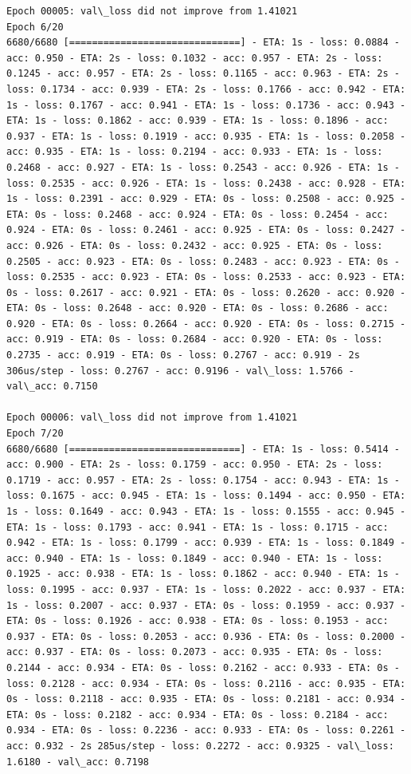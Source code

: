 \documentclass[11pt]{article}
\begin{document}
\begin{Verbatim}[commandchars=\\\{\}]
Epoch 00005: val\_loss did not improve from 1.41021
Epoch 6/20
6680/6680 [==============================] - ETA: 1s - loss: 0.0884 - acc: 0.950 - ETA: 2s - loss: 0.1032 - acc: 0.957 - ETA: 2s - loss: 0.1245 - acc: 0.957 - ETA: 2s - loss: 0.1165 - acc: 0.963 - ETA: 2s - loss: 0.1734 - acc: 0.939 - ETA: 2s - loss: 0.1766 - acc: 0.942 - ETA: 1s - loss: 0.1767 - acc: 0.941 - ETA: 1s - loss: 0.1736 - acc: 0.943 - ETA: 1s - loss: 0.1862 - acc: 0.939 - ETA: 1s - loss: 0.1896 - acc: 0.937 - ETA: 1s - loss: 0.1919 - acc: 0.935 - ETA: 1s - loss: 0.2058 - acc: 0.935 - ETA: 1s - loss: 0.2194 - acc: 0.933 - ETA: 1s - loss: 0.2468 - acc: 0.927 - ETA: 1s - loss: 0.2543 - acc: 0.926 - ETA: 1s - loss: 0.2535 - acc: 0.926 - ETA: 1s - loss: 0.2438 - acc: 0.928 - ETA: 1s - loss: 0.2391 - acc: 0.929 - ETA: 0s - loss: 0.2508 - acc: 0.925 - ETA: 0s - loss: 0.2468 - acc: 0.924 - ETA: 0s - loss: 0.2454 - acc: 0.924 - ETA: 0s - loss: 0.2461 - acc: 0.925 - ETA: 0s - loss: 0.2427 - acc: 0.926 - ETA: 0s - loss: 0.2432 - acc: 0.925 - ETA: 0s - loss: 0.2505 - acc: 0.923 - ETA: 0s - loss: 0.2483 - acc: 0.923 - ETA: 0s - loss: 0.2535 - acc: 0.923 - ETA: 0s - loss: 0.2533 - acc: 0.923 - ETA: 0s - loss: 0.2617 - acc: 0.921 - ETA: 0s - loss: 0.2620 - acc: 0.920 - ETA: 0s - loss: 0.2648 - acc: 0.920 - ETA: 0s - loss: 0.2686 - acc: 0.920 - ETA: 0s - loss: 0.2664 - acc: 0.920 - ETA: 0s - loss: 0.2715 - acc: 0.919 - ETA: 0s - loss: 0.2684 - acc: 0.920 - ETA: 0s - loss: 0.2735 - acc: 0.919 - ETA: 0s - loss: 0.2767 - acc: 0.919 - 2s 306us/step - loss: 0.2767 - acc: 0.9196 - val\_loss: 1.5766 - val\_acc: 0.7150

Epoch 00006: val\_loss did not improve from 1.41021
Epoch 7/20
6680/6680 [==============================] - ETA: 1s - loss: 0.5414 - acc: 0.900 - ETA: 2s - loss: 0.1759 - acc: 0.950 - ETA: 2s - loss: 0.1719 - acc: 0.957 - ETA: 2s - loss: 0.1754 - acc: 0.943 - ETA: 1s - loss: 0.1675 - acc: 0.945 - ETA: 1s - loss: 0.1494 - acc: 0.950 - ETA: 1s - loss: 0.1649 - acc: 0.943 - ETA: 1s - loss: 0.1555 - acc: 0.945 - ETA: 1s - loss: 0.1793 - acc: 0.941 - ETA: 1s - loss: 0.1715 - acc: 0.942 - ETA: 1s - loss: 0.1799 - acc: 0.939 - ETA: 1s - loss: 0.1849 - acc: 0.940 - ETA: 1s - loss: 0.1849 - acc: 0.940 - ETA: 1s - loss: 0.1925 - acc: 0.938 - ETA: 1s - loss: 0.1862 - acc: 0.940 - ETA: 1s - loss: 0.1995 - acc: 0.937 - ETA: 1s - loss: 0.2022 - acc: 0.937 - ETA: 1s - loss: 0.2007 - acc: 0.937 - ETA: 0s - loss: 0.1959 - acc: 0.937 - ETA: 0s - loss: 0.1926 - acc: 0.938 - ETA: 0s - loss: 0.1953 - acc: 0.937 - ETA: 0s - loss: 0.2053 - acc: 0.936 - ETA: 0s - loss: 0.2000 - acc: 0.937 - ETA: 0s - loss: 0.2073 - acc: 0.935 - ETA: 0s - loss: 0.2144 - acc: 0.934 - ETA: 0s - loss: 0.2162 - acc: 0.933 - ETA: 0s - loss: 0.2128 - acc: 0.934 - ETA: 0s - loss: 0.2116 - acc: 0.935 - ETA: 0s - loss: 0.2118 - acc: 0.935 - ETA: 0s - loss: 0.2181 - acc: 0.934 - ETA: 0s - loss: 0.2182 - acc: 0.934 - ETA: 0s - loss: 0.2184 - acc: 0.934 - ETA: 0s - loss: 0.2236 - acc: 0.933 - ETA: 0s - loss: 0.2261 - acc: 0.932 - 2s 285us/step - loss: 0.2272 - acc: 0.9325 - val\_loss: 1.6180 - val\_acc: 0.7198


\end{Verbatim}
\end{document}
